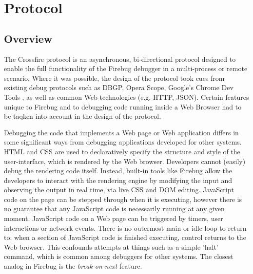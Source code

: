 \section {Protocol}
\subsection {Overview}
The Crossfire protocol is an asynchronous, bi-directional protocol designed to
enable the full functionality of the Firebug debugger in a multi-process or
remote scenario. Where it was possible, the design of the protocol took cues
from existing debug protocols such as DBGP\cite{dbgp}, Opera
Scope\cite{opera-scope}, Google's Chrome Dev Tools\cite{chrome-dev-tools} , as
well as common Web technologies (e.g. HTTP, JSON\cite{json}). Certain
features unique to Firebug and to debugging code running inside a Web Browser
had to be taqken into account in the design of the protocol.

Debugging the code that implements a Web page or Web application differs in some
significant ways from debugging applications developed for other systems.
HTML and CSS are used to declaratively specify the structure and style of the
user-interface, which is rendered by the Web browser. Developers cannot (easily)
debug the rendering code itself. Instead, built-in tools like Firebug allow the
developers to interact with the rendering engine by modifying the input and
observing the output in real time, via live CSS and DOM editing. JavaScript code
on the page can be stepped through when it is executing, however there is no
guarantee that any JavaScript code is necessarily running at any given moment.
JavaScript code on a Web page can be triggered by timers, user interactions or
network events. There is no outermost main or idle loop to return to; when a
section of JavaScript code is finished executing, control returns to the Web
browser. This confounds attempts at things such as a simple 'halt' command,
which is common among debuggers for other systems. The closest analog in Firebug
is the \textit{break-on-next} feature.

